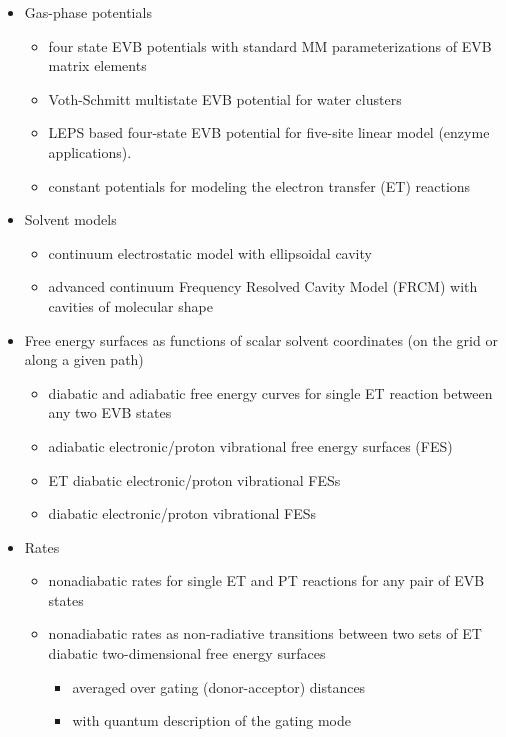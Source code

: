 \documentclass[oneside,11pt,openany]{book}
\begin{document}
\begin{itemize}

\item Gas-phase potentials
\begin{itemize}
\item four state EVB potentials with standard MM parameterizations
      of EVB matrix elements \cite{pcet-jacs}
\item Voth-Schmitt multistate EVB potential for water clusters
      \cite{voth-schmitt}
\item LEPS based four-state EVB potential for five-site linear
      model (enzyme applications).
\item constant potentials for modeling the electron transfer (ET)
      reactions
\end{itemize}

\item Solvent models
\begin{itemize}
\item continuum electrostatic model with ellipsoidal cavity
      \cite{Kirkwood38}
\item advanced continuum Frequency Resolved Cavity Model (FRCM)
      with cavities of molecular shape \cite{Rostov-1}
\end{itemize}

\item Free energy surfaces as functions of scalar solvent
      coordinates (on the grid or along a given path)
\begin{itemize}
\item diabatic and adiabatic free energy curves for single ET
      reaction between any two EVB states
\item adiabatic electronic/proton vibrational free energy surfaces (FES)
\item ET diabatic electronic/proton vibrational FESs
\item diabatic electronic/proton vibrational FESs
\end{itemize}

\item Rates
\begin{itemize}
\item nonadiabatic rates for single ET and PT reactions for
      any pair of EVB states
\item nonadiabatic rates as non-radiative transitions between
      two sets of ET diabatic two-dimensional free energy
      surfaces \cite{pcet-jcp2}
      \begin{itemize}
            \item averaged over gating (donor-acceptor) distances
            \item with quantum description of the gating mode
      \end{itemize}
\end{itemize}


\end{itemize}
\end{document}
